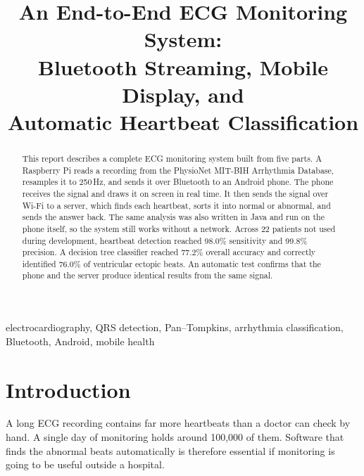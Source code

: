 \documentclass[conference]{IEEEtran}
\begin{document}
\title{An End-to-End ECG Monitoring System:\\
       Bluetooth Streaming, Mobile Display, and\\
       Automatic Heartbeat Classification}

\author{
}

\maketitle

\begin{abstract}
This report describes a complete ECG monitoring system built from five parts. A
Raspberry Pi reads a recording from the PhysioNet MIT-BIH Arrhythmia Database,
resamples it to 250\,Hz, and sends it over Bluetooth to an Android phone. The
phone receives the signal and draws it on screen in real time. It then sends the
signal over Wi-Fi to a server, which finds each heartbeat, sorts it into normal
or abnormal, and sends the answer back. The same analysis was also written in
Java and run on the phone itself, so the system still works without a network.
Across 22 patients not used during development, heartbeat detection reached
98.0\% sensitivity and 99.8\% precision. A decision tree classifier reached
77.2\% overall accuracy and correctly identified 76.0\% of ventricular ectopic
beats. An automatic test confirms that the phone and the server produce
identical results from the same signal.
\end{abstract}

\begin{IEEEkeywords}
electrocardiography, QRS detection, Pan--Tompkins, arrhythmia classification,
Bluetooth, Android, mobile health
\end{IEEEkeywords}

\section{Introduction}

A long ECG recording contains far more heartbeats than a doctor can check by
hand. A single day of monitoring holds around 100{,}000 of them. Software that
finds the abnormal beats automatically is therefore essential if monitoring is
going to be useful outside a hospital.
\end{document}
